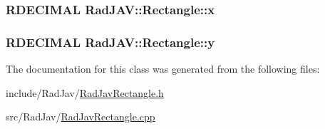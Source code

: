 \subsubsection[{\texorpdfstring{x}{x}}]{\setlength{\rightskip}{0pt plus 5cm}R\+D\+E\+C\+I\+M\+AL Rad\+J\+A\+V\+::\+Rectangle\+::x\hspace{0.3cm}{\ttfamily [protected]}}\hypertarget{class_rad_j_a_v_1_1_rectangle_a4dbccb2aa36d79f389657c68c0f70a99}{}\label{class_rad_j_a_v_1_1_rectangle_a4dbccb2aa36d79f389657c68c0f70a99}
\subsubsection[{\texorpdfstring{y}{y}}]{\setlength{\rightskip}{0pt plus 5cm}R\+D\+E\+C\+I\+M\+AL Rad\+J\+A\+V\+::\+Rectangle\+::y\hspace{0.3cm}{\ttfamily [protected]}}\hypertarget{class_rad_j_a_v_1_1_rectangle_a92ea570496c2caaf280a693614fecb86}{}\label{class_rad_j_a_v_1_1_rectangle_a92ea570496c2caaf280a693614fecb86}


The documentation for this class was generated from the following files\+:\begin{DoxyCompactItemize}
\item 
include/\+Rad\+Jav/\hyperlink{_rad_jav_rectangle_8h}{Rad\+Jav\+Rectangle.\+h}\item 
src/\+Rad\+Jav/\hyperlink{_rad_jav_rectangle_8cpp}{Rad\+Jav\+Rectangle.\+cpp}\end{DoxyCompactItemize}

